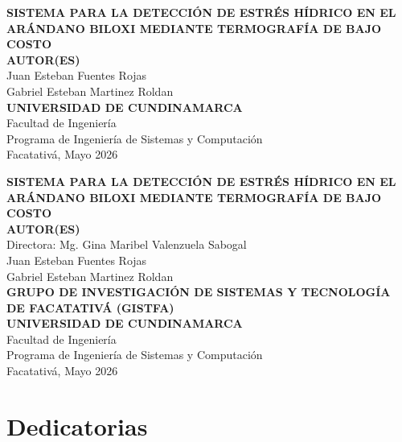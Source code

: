 \documentclass[12pt,openright,oneside]{book}
\begin{document}
\setcounter{page}{1}

\begin{titlepage}
    \begin{center}
        \vspace*{2cm}
        {\Large\textbf{SISTEMA PARA LA DETECCIÓN DE ESTRÉS HÍDRICO EN EL ARÁNDANO BILOXI MEDIANTE TERMOGRAFÍA DE BAJO COSTO}}\\[4cm]
        {\large\textbf{AUTOR(ES)}}\\
        Juan Esteban Fuentes Rojas\\
        Gabriel Esteban Martinez Roldan\\[6cm]
        \textbf{UNIVERSIDAD DE CUNDINAMARCA}\\
        Facultad de Ingeniería\\
        Programa de Ingeniería de Sistemas y Computación\\
        Facatativá, Mayo 2026
    \end{center}
\end{titlepage}

\newpage
\thispagestyle{empty}
\begin{center}
    \vspace*{2cm}
    {\Large\textbf{SISTEMA PARA LA DETECCIÓN DE ESTRÉS HÍDRICO EN EL ARÁNDANO BILOXI MEDIANTE TERMOGRAFÍA DE BAJO COSTO}}\\[3cm]
    {\large\textbf{AUTOR(ES)}}\\
    Directora: Mg. Gina Maribel Valenzuela Sabogal\\
    Juan Esteban Fuentes Rojas\\
    Gabriel Esteban Martinez Roldan\\[3cm]
    \textbf{GRUPO DE INVESTIGACIÓN DE SISTEMAS Y TECNOLOGÍA DE FACATATIVÁ (GISTFA)}\\[3cm]
    \textbf{UNIVERSIDAD DE CUNDINAMARCA}\\
    Facultad de Ingeniería\\
    Programa de Ingeniería de Sistemas y Computación\\
    Facatativá, Mayo 2026
\end{center}

\chapter*{Dedicatorias}
\end{document}
